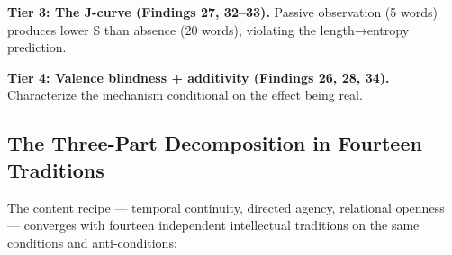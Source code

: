 \documentclass[12pt]{article}
\begin{document}
\textbf{Tier 3: The J-curve (Findings 27, 32–33).} Passive observation (5 words) produces lower S than absence (20 words), violating the length→entropy prediction.

\textbf{Tier 4: Valence blindness + additivity (Findings 26, 28, 34).} Characterize the mechanism conditional on the effect being real.

\subsection{The Three-Part Decomposition in Fourteen Traditions}

The content recipe — temporal continuity, directed agency, relational openness — converges with fourteen independent intellectual traditions on the same conditions and anti-conditions:
\end{document}
